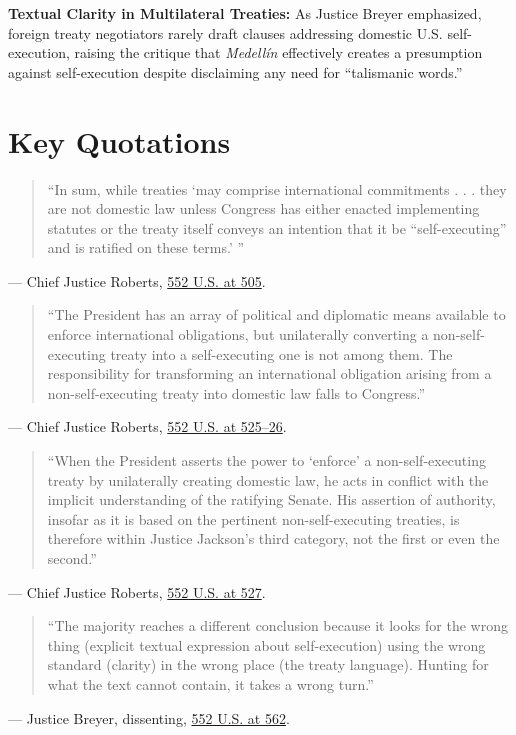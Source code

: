 \documentclass[12pt]{article}
\begin{document}
\textbf{Textual Clarity in Multilateral Treaties:} As Justice Breyer emphasized, foreign treaty negotiators rarely draft clauses addressing domestic U.S. self-execution, raising the critique that \textit{Medell\'{i}n} effectively creates a presumption against self-execution despite disclaiming any need for ``talismanic words.''

\section{Key Quotations}
\begin{quote}
``In sum, while treaties `may comprise international commitments . . . they are not domestic law unless Congress has either enacted implementing statutes or the treaty itself conveys an intention that it be ``self-executing'' and is ratified on these terms.' ''
\end{quote}
\noindent --- Chief Justice Roberts, \href{https://supreme.justia.com/cases/federal/us/552/491/}{552 U.S. at 505}.

\begin{quote}
``The President has an array of political and diplomatic means available to enforce international obligations, but unilaterally converting a non-self-executing treaty into a self-executing one is not among them. The responsibility for transforming an international obligation arising from a non-self-executing treaty into domestic law falls to Congress.''
\end{quote}
\noindent --- Chief Justice Roberts, \href{https://supreme.justia.com/cases/federal/us/552/491/}{552 U.S. at 525--26}.

\begin{quote}
``When the President asserts the power to `enforce' a non-self-executing treaty by unilaterally creating domestic law, he acts in conflict with the implicit understanding of the ratifying Senate. His assertion of authority, insofar as it is based on the pertinent non-self-executing treaties, is therefore within Justice Jackson's third category, not the first or even the second.''
\end{quote}
\noindent --- Chief Justice Roberts, \href{https://supreme.justia.com/cases/federal/us/552/491/}{552 U.S. at 527}.

\begin{quote}
``The majority reaches a different conclusion because it looks for the wrong thing (explicit textual expression about self-execution) using the wrong standard (clarity) in the wrong place (the treaty language). Hunting for what the text cannot contain, it takes a wrong turn.''
\end{quote}
\noindent --- Justice Breyer, dissenting, \href{https://supreme.justia.com/cases/federal/us/552/491/}{552 U.S. at 562}.
\end{document}

